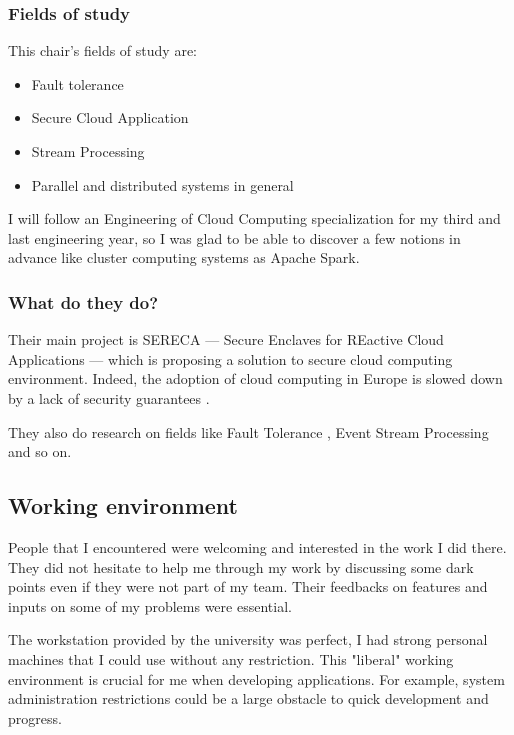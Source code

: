 \documentclass[a4paper,11pt]{report}
\begin{document}
\subsubsection{Fields of study}

This chair's fields of study are:
\begin{itemize}
\item
Fault tolerance
\item
Secure Cloud Application
\item
Stream Processing
\item
Parallel and distributed systems in general
\end{itemize}

I will follow an Engineering of Cloud Computing specialization for my third and last engineering year, so I was glad to be able to discover a few notions in advance like cluster computing systems as Apache Spark.

\subsubsection{What do they do?}

Their main project is SERECA --- Secure Enclaves for REactive Cloud Applications --- which is proposing a solution to secure cloud computing environment. Indeed, the adoption of cloud computing in Europe is slowed down by a lack of security guarantees \cite{tud:chair:project}.

They also do research on fields like Fault Tolerance \cite{tud:chair:papers:fault}, Event Stream Processing \cite{ tud:chair:papers:stream} and so on.

\subsection{Working environment}\label{working_environment}

People that I encountered were welcoming and interested in the work I did there. They did not hesitate to help me through my work by discussing some dark points even if they were not part of my team. Their feedbacks on features and inputs on some of my problems were essential.

The workstation provided by the university was perfect, I had strong personal machines that I could use without any restriction. This "liberal" working environment is crucial for me when developing applications. For example, system administration restrictions could be a large obstacle to quick development and progress.
\end{document}

